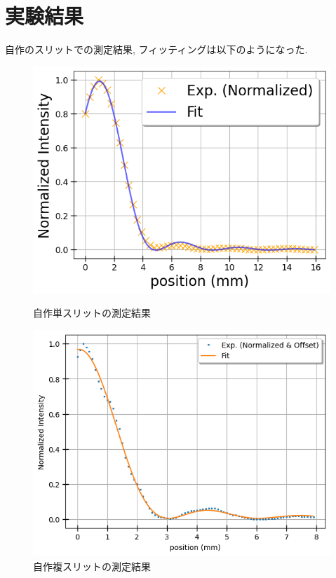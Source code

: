 \documentclass[11pt]{ltjsarticle}
\begin{document}
  \section*{実験結果}
    自作のスリットでの測定結果, フィッティングは以下のようになった.
    \begin{figure}[H]
      \centering
      \begin{minipage}
        [b]{0.48\columnwidth}
        \centering
        \includegraphics[width=\linewidth]{single_jisaku.png}
        \caption{自作単スリットの測定結果}
        \label{fig:single_result}
      \end{minipage}
    \begin{minipage}[b]{0.48\columnwidth}
      \centering
      \includegraphics[width=\linewidth]{double_jisaku.png}
      \caption{自作複スリットの測定結果}
      \label{fig:double_result}
    \end{minipage}
    \end{figure}
\end{document}
